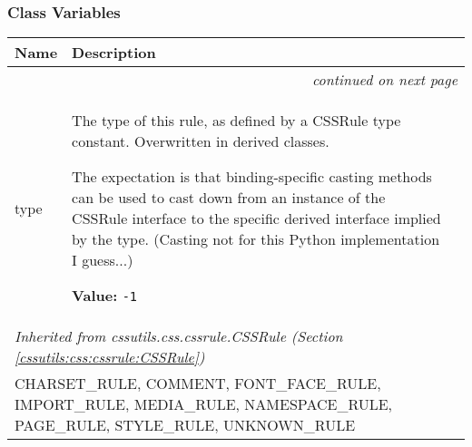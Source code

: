 
  \subsubsection{Class Variables}

    \vspace{-1cm}
\hspace{\varindent}\begin{longtable}{|p{\varnamewidth}|p{\vardescrwidth}|l}
\cline{1-2}
\cline{1-2} \centering \textbf{Name} & \centering \textbf{Description}& \\
\cline{1-2}
\endhead\cline{1-2}\multicolumn{3}{r}{\small\textit{continued on next page}}\\\endfoot\cline{1-2}
\endlastfoot\raggedright t\-y\-p\-e\- & \raggedright The type of this rule, as defined by a CSSRule type constant.
Overwritten in derived classes.

The expectation is that binding-specific casting methods can be used to
cast down from an instance of the CSSRule interface to the specific
derived interface implied by the type.
(Casting not for this Python implementation I guess...)

\textbf{Value:} 
{\tt -1}&\\
\cline{1-2}
\multicolumn{2}{|l|}{\textit{Inherited from cssutils.css.cssrule.CSSRule \textit{(Section \ref{cssutils:css:cssrule:CSSRule})}}}\\
\multicolumn{2}{|p{\varwidth}|}{\raggedright CHARSET\_RULE, COMMENT, FONT\_FACE\_RULE, IMPORT\_RULE, MEDIA\_RULE, NAMESPACE\_RULE, PAGE\_RULE, STYLE\_RULE, UNKNOWN\_RULE}\\
\cline{1-2}
\end{longtable}



